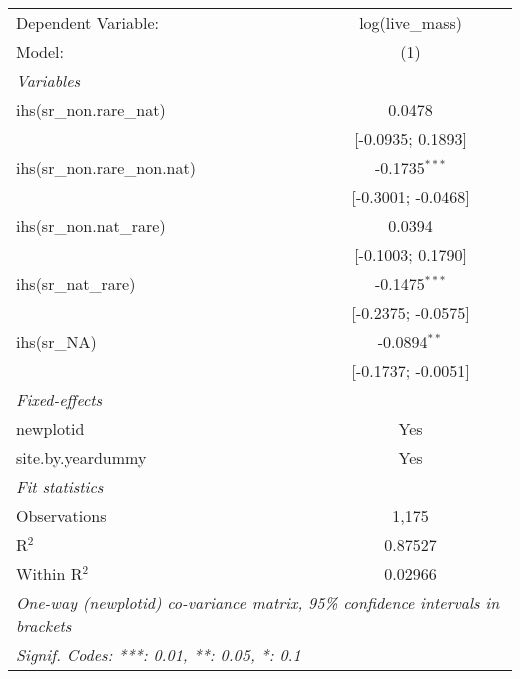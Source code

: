 \begin{tabular}{lc}
\tabularnewline\midrule\midrule
Dependent Variable:&log(live\_mass)\\
Model:&(1)\\
\midrule \emph{Variables}&  \\
ihs(sr\_non.rare\_nat)&0.0478\\
  &[-0.0935; 0.1893]\\
ihs(sr\_non.rare\_non.nat)&-0.1735$^{***}$\\
  &[-0.3001; -0.0468]\\
ihs(sr\_non.nat\_rare)&0.0394\\
  &[-0.1003; 0.1790]\\
ihs(sr\_nat\_rare)&-0.1475$^{***}$\\
  &[-0.2375; -0.0575]\\
ihs(sr\_NA)&-0.0894$^{**}$\\
  &[-0.1737; -0.0051]\\
\midrule \emph{Fixed-effects}&  \\
newplotid & Yes\\
site.by.yeardummy & Yes\\
\midrule \emph{Fit statistics}&  \\
Observations & 1,175\\
R$^2$ & 0.87527\\
Within R$^2$ & 0.02966\\
\midrule\midrule\multicolumn{2}{l}{\emph{One-way (newplotid) co-variance matrix, 95\% confidence intervals in brackets}}\\
\multicolumn{2}{l}{\emph{Signif. Codes: ***: 0.01, **: 0.05, *: 0.1}}\\
\end{tabular}


